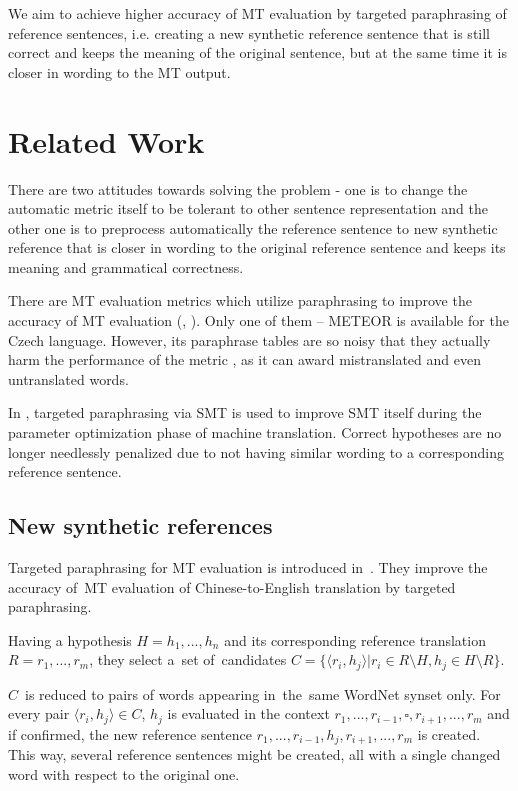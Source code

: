 \documentclass[11pt]{article}
\def \xxx#1{\textbf{\textcolor{red}{xxx: #1}}}
\begin{document}
We aim to achieve higher accuracy of MT evaluation by targeted paraphrasing 
of reference sentences, i.e. creating a new synthetic reference sentence that 
is still correct and keeps the meaning of the original sentence, but at the 
same time it is closer in wording to the MT output. 


\section{Related Work}
There are two attitudes towards solving the problem - one is to change the automatic
metric itself to be tolerant to other sentence representation and the other one is to 
preprocess automatically the reference sentence to new synthetic reference that is closer 
in wording to the original reference sentence and keeps its meaning and grammatical correctness.

There are MT evaluation metrics which utilize paraphrasing to improve the 
accuracy of MT evaluation (\cite{terp}, \cite{paraeval}). Only one of them -- METEOR 
\cite{meteor-wmt:2014} is available for the Czech language. However, its paraphrase 
tables are so noisy that they actually harm the performance of the metric \cite{parmesan}, 
as it can award mistranslated and even untranslated words.

In \cite{madnani:2010}, targeted paraphrasing via SMT is used to improve SMT itself 
during the parameter optimization phase of machine translation. Correct hypotheses 
are no longer needlessly penalized due to not having similar wording to a 
corresponding reference sentence. %



\subsection{New synthetic references}
Targeted paraphrasing for MT evaluation is introduced in~. They 
improve the accuracy of~MT evaluation of Chinese-to-English translation by targeted 
paraphrasing.

Having a hypothesis $ H = h_1,...,h_n $ and its corresponding reference translation 
$ R =r_1, ...,r_m $, they select a~set of~candidates 
$ C = \lbrace \langle r_i,h_j \rangle  \vert r_i \in R \setminus H, h_j \in H \setminus R \rbrace $. 
 
$ C $~is reduced to pairs of words appearing in~the~same WordNet synset only. For every pair 
$  \langle r_i,h_j \rangle \in C $, $ h_j $ is evaluated in the context $ r_1,...,r_{i-1},\square,r_{i+1},...,r_m $
and if confirmed, the new reference sentence $ r_1,...,r_{i-1},h_j,r_{i+1},...,r_m $ is created.
This way, several reference sentences might be created, all with a single changed word with respect
to the original one.
\end{document}
